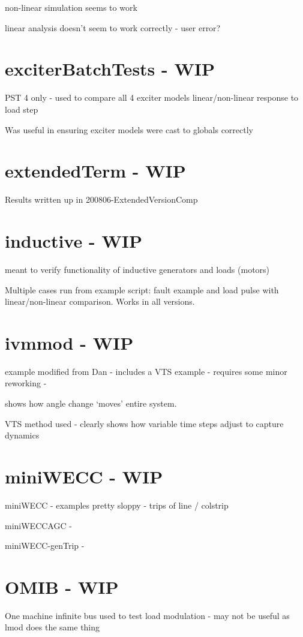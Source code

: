 non-linear simulation seems to work

linear analysis doesn't seem to work correctly - user error?


\section{exciterBatchTests - WIP}
PST 4 only - used to compare all 4 exciter models linear/non-linear response to load step

Was useful in ensuring exciter models were cast to globals correctly

\section{extendedTerm - WIP}
Results written up in 200806-ExtendedVersionComp


\section{inductive - WIP}
meant to verify functionality of inductive generators and loads (motors)

Multiple cases run from example script: fault example and load pulse with linear/non-linear comparison.
Works in all versions.

\section{ivmmod - WIP}
example modified from Dan - includes a VTS example  -
requires some minor reworking - 

shows how angle change `moves' entire system.

VTS method used - clearly shows how variable time steps adjust to capture dynamics

\section{miniWECC - WIP}

	miniWECC - examples pretty sloppy - trips of line / colstrip

	miniWECCAGC - 

	miniWECC-genTrip -


\section{OMIB - WIP}
One machine infinite bus used to test load modulation - may not be useful as lmod does the same thing

